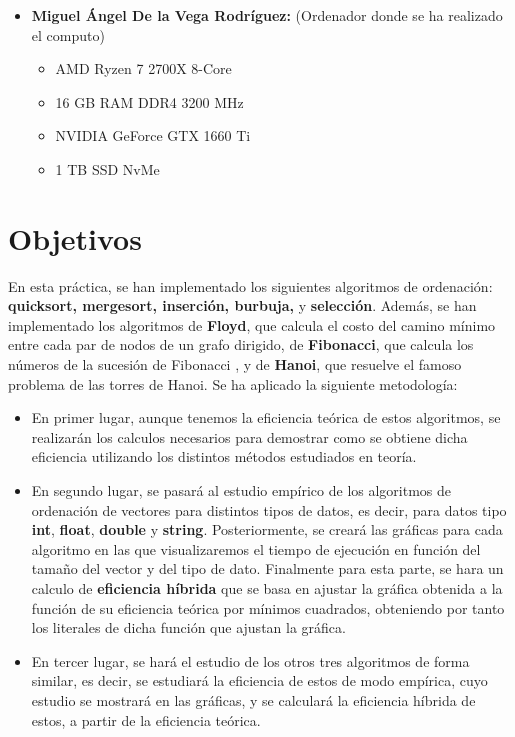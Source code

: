 \documentclass[11pt]{article}
\begin{document}
\begin{itemize}
    \item \textbf{Miguel Ángel De la Vega Rodríguez:} (Ordenador donde se ha realizado el computo)
        \begin{itemize}
            \item AMD Ryzen 7 2700X 8-Core
            \item 16 GB RAM DDR4 3200 MHz
            \item NVIDIA GeForce GTX 1660 Ti 
            \item 1 TB SSD NvMe 
        \end{itemize}
\end{itemize}

\section{Objetivos}
    En esta práctica, se han implementado los siguientes algoritmos de ordenación: \textbf{quicksort, mergesort, inserción, burbuja,}
    y \textbf{selección}. Además, se han implementado los algoritmos de \textbf{Floyd}, que calcula el costo del camino mínimo entre cada par de nodos 
    de un grafo dirigido, de \textbf{Fibonacci}, que calcula los números de la sucesión de Fibonacci , y de \textbf{Hanoi}, que resuelve el famoso 
    problema de las torres de Hanoi. Se ha aplicado la siguiente metodología:
    \begin{itemize}
        \item En primer lugar, aunque tenemos la eficiencia teórica de estos algoritmos, se realizarán los calculos necesarios para demostrar
        como se obtiene dicha eficiencia utilizando los distintos métodos estudiados en teoría. \\
        
        \item En segundo lugar, se pasará al estudio empírico de los algoritmos de ordenación de vectores para distintos tipos de datos, es decir, 
        para datos tipo \textbf{int}, \textbf{float}, \textbf{double} y \textbf{string}. Posteriormente, se creará las gráficas para
        cada algoritmo en las que visualizaremos el tiempo de ejecución en función del tamaño del vector y del tipo de dato. Finalmente 
        para esta parte, se hara un calculo de \textbf{eficiencia híbrida} que se basa en ajustar la gráfica obtenida a la función de su eficiencia
        teórica por mínimos cuadrados, obteniendo por tanto los literales de dicha función que ajustan la gráfica.\\
        
        \item En tercer lugar, se hará el estudio de los otros tres algoritmos de forma similar, es decir, se estudiará la eficiencia
        de estos de modo empírica, cuyo estudio se mostrará en las gráficas, y se calculará la eficiencia híbrida de estos, a partir
        de la eficiencia teórica.\\     
    \end{itemize}
\end{document}
